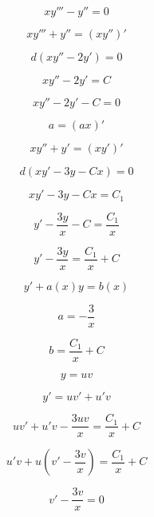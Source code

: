 \documentclass{article}
\begin{document}
\begin{center}
\end{center}
\begin{center}
\end{center}

\begin{center}
\end{center}

\begin{center}
\end{center}

\begin{center}
\\\\
\end{center}

\begin{center}
\\\\
\end{center}

$$xy''' - y'' = 0$$

$$xy''' + y'' = (xy'')'$$

$$d(xy'' - 2y') = 0$$

$$xy'' - 2y' = C$$

$$xy'' - 2y' - C = 0$$

$$a = (ax)'$$

$$xy'' + y' = (xy')'$$

$$d(xy' - 3y - Cx) = 0$$

$$xy' - 3y - Cx = C_1$$

$$y' - \frac{3y}{x} - C = \frac{C_1}{x}$$

$$y' - \frac{3y}{x} = \frac{C_1}{x} + C$$

$$y' + a(x)y = b(x)$$

$$a = -\frac{3}{x}$$ 

$$b = \frac{C_1}{x} + C$$

$$y = uv$$

$$y' = uv' + u'v$$

$$uv' + u'v - \frac{3uv}{x} = \frac{C_1}{x} + C$$

$$u'v + u(v' - \frac{3v}{x}) = \frac{C_1}{x} + C$$

$$v' - \frac{3v}{x} = 0$$
\end{document}
